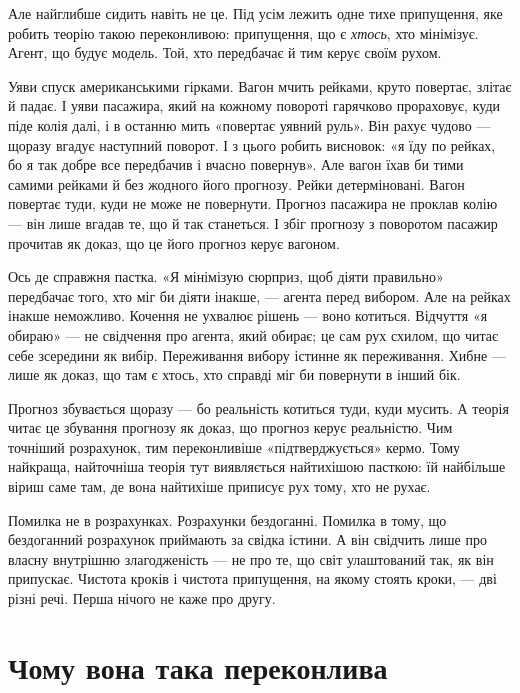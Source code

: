 \documentclass[12pt, a4paper, openany]{book}
\begin{document}
Але найглибше сидить навіть не це. Під усім лежить одне тихе припущення, яке робить теорію такою переконливою: припущення, що є \emph{хтось}, хто мінімізує. Агент, що будує модель. Той, хто передбачає й тим керує своїм рухом.

Уяви спуск американськими гірками. Вагон мчить рейками, круто повертає, злітає й падає. І уяви пасажира, який на кожному повороті гарячково прораховує, куди піде колія далі, і в останню мить «повертає уявний руль». Він рахує чудово --- щоразу вгадує наступний поворот. І з цього робить висновок: «я їду по рейках, бо я так добре все передбачив і вчасно повернув». Але вагон їхав би тими самими рейками й без жодного його прогнозу. Рейки детерміновані. Вагон повертає туди, куди не може не повернути. Прогноз пасажира не проклав колію --- він лише вгадав те, що й так станеться. І збіг прогнозу з поворотом пасажир прочитав як доказ, що це його прогноз керує вагоном.

Ось де справжня пастка. «Я мінімізую сюрприз, щоб діяти правильно» передбачає того, хто міг би діяти інакше, --- агента перед вибором. Але на рейках інакше неможливо. Кочення не ухвалює рішень --- воно котиться. Відчуття «я обираю» --- не свідчення про агента, який обирає; це сам рух схилом, що читає себе зсередини як вибір. Переживання вибору істинне як переживання. Хибне --- лише як доказ, що там є хтось, хто справді міг би повернути в інший бік.

Прогноз збувається щоразу --- бо реальність котиться туди, куди мусить. А теорія читає це збування прогнозу як доказ, що прогноз керує реальністю. Чим точніший розрахунок, тим переконливіше «підтверджується» кермо. Тому найкраща, найточніша теорія тут виявляється найтихішою пасткою: їй найбільше віриш саме там, де вона найтихіше приписує рух тому, хто не рухає.

\begin{analogybox}
Помилка не в розрахунках. Розрахунки бездоганні. Помилка в тому, що бездоганний розрахунок приймають за свідка істини. А він свідчить лише про власну внутрішню злагодженість --- не про те, що світ улаштований так, як він припускає. Чистота кроків і чистота припущення, на якому стоять кроки, --- дві різні речі. Перша нічого не каже про другу.
\end{analogybox}

\section{Чому вона така переконлива}
\end{document}
